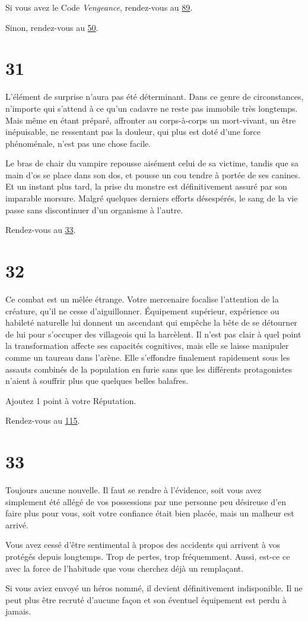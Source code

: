 \documentclass{report}
\newcommand{\gsection}[1]{
    \section{#1}
    \label{section-#1}
}
\newcommand{\glink}[1]{\hyperref[section-#1]{#1}}
\begin{document}
Si vous avez le Code \emph{Vengeance}, rendez-vous au \glink{89}.

Sinon, rendez-vous au \glink{50}.

\gsection{31}

L'élément de surprise n'aura pas été déterminant. Dans ce genre de circonstances, n'importe qui s'attend à ce qu'un cadavre ne reste pas immobile très longtemps. Mais même en étant préparé, affronter au corps-à-corps un mort-vivant, un être inépuisable, ne ressentant pas la douleur, qui plus est doté d'une force phénoménale, n'est pas une chose facile.

Le bras de chair du  vampire repousse aisément celui de sa victime, tandis que sa main d'os se place dans son dos, et pousse un cou tendre à portée de ses canines. Et un instant plus tard, la prise du monstre est définitivement assuré par son imparable morsure. Malgré quelques derniers efforts désespérés, le sang de la vie passe sans discontinuer d'un organisme à l'autre.

Rendez-vous au \glink{33}.

\gsection{32}

Ce combat est un mêlée étrange. Votre mercenaire focalise l'attention de la créature, qu'il ne cesse d'aiguillonner. Équipement supérieur, expérience ou habileté naturelle lui donnent un ascendant qui empêche la bête de se détourner de lui pour s'occuper des villageois qui la harcèlent. Il n'est pas clair à quel point la transformation affecte ses capacités cognitives, mais elle se laisse manipuler comme un taureau dans l'arène. Elle s'effondre finalement rapidement sous les assauts combinés de la population en furie sans que les différents protagonistes n'aient à souffrir plus que quelques belles balafres.

Ajoutez 1 point à votre Réputation.

Rendez-vous au \glink{115}.

\gsection{33}

Toujours aucune nouvelle. Il faut se rendre à l'évidence, soit vous avez simplement été allégé de vos possessions par une personne peu désireuse d'en faire plus pour vous, soit votre confiance était bien placée, mais un malheur est arrivé.

Vous avez cessé d'être sentimental à propos des accidents qui arrivent à vos protégés depuis longtemps. Trop de pertes, trop fréquemment. Aussi, est-ce ce avec la force de l'habitude que vous cherchez déjà un remplaçant.

Si vous aviez envoyé un héros nommé, il devient définitivement indisponible. Il ne peut plus être recruté d'aucune façon et son éventuel équipement est perdu à jamais.
\end{document}

